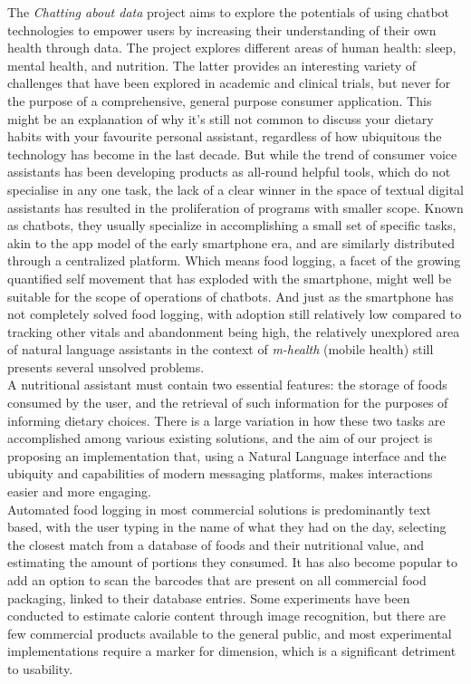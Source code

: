 The \textit{Chatting about data} project aims to explore the potentials of using chatbot technologies to empower users by increasing their understanding of their own health through data. The project explores different areas of human health: sleep, mental health, and nutrition. The latter provides an interesting variety of challenges that have been explored in academic and clinical trials, but never for the purpose of a comprehensive, general purpose consumer application. This might be an explanation of why it’s still not common to discuss your dietary habits with your favourite personal assistant, regardless of how ubiquitous the technology has become in the last decade. But while the trend of consumer voice assistants has been developing products as all-round helpful tools, which do not specialise in any one task, the lack of a clear winner in the space of textual digital assistants has resulted in the proliferation of programs with smaller scope. Known as chatbots, they usually specialize in accomplishing a small set of specific tasks, akin to the app model of the early smartphone era, and are similarly distributed through a centralized platform. Which means food logging, a facet of the growing quantified self movement that has exploded with the smartphone, might well be suitable for the scope of operations of chatbots. And just as the smartphone has not completely solved food logging, with adoption still relatively low compared to tracking other vitals and abandonment being high, the relatively unexplored area of natural language assistants in the context of \textit{m-health} (mobile health) still presents several unsolved problems. \\
A nutritional assistant must contain two essential features: the storage of foods consumed by the user, and the retrieval of such information for the purposes of informing dietary choices. There is a large variation in how these two tasks are accomplished among various existing solutions, and the aim of our project is proposing an implementation that, using a Natural Language interface and the ubiquity and capabilities of modern messaging platforms, makes interactions easier and more engaging. \\
Automated food logging in most commercial solutions is predominantly text based, with the user typing in the name of what they had on the day, selecting the closest match from a database of foods and their nutritional value, and estimating the amount of portions they consumed. It has also become popular to add an option to scan the barcodes that are present on all commercial food packaging, linked to their database entries. Some experiments have been conducted to estimate calorie content through image recognition, but there are few commercial products available to the general public, and most experimental implementations require a marker for dimension, which is a significant detriment to usability. \\
